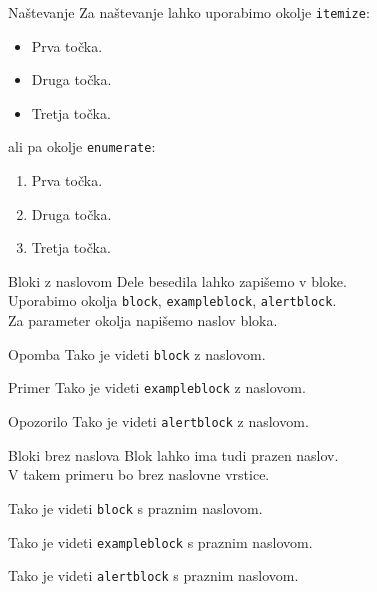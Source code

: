 \documentclass{beamer}
\begin{document}
   \begin{frame}{Naštevanje}
   Za naštevanje lahko uporabimo okolje \texttt{itemize}:
   \begin{itemize}   
      \item Prva točka.
      \item Druga točka.
      \item Tretja točka.
   \end{itemize}
   ali pa okolje \texttt{enumerate}:
   \begin{enumerate}
      \item Prva točka.
      \item Druga točka.
      \item Tretja točka.
\end{enumerate}
   \end{frame}
\begin{frame}{Bloki z naslovom}
   Dele besedila lahko zapišemo v bloke. \\
   Uporabimo okolja \texttt{block}, \texttt{exampleblock}, \texttt{alertblock}. \\
   Za parameter okolja napišemo naslov bloka.
   \begin{block}{Opomba}
      Tako je videti \texttt{block} z naslovom.
   \end{block}
   \begin{exampleblock}{Primer}
      Tako je videti \texttt{exampleblock} z naslovom.
   \end{exampleblock}
   \begin{alertblock}{Opozorilo}
      Tako je videti \texttt{alertblock} z naslovom.
   \end{alertblock}
\end{frame}
\begin{frame}{Bloki brez naslova}
   Blok lahko ima tudi prazen naslov. \\
   V takem primeru bo brez naslovne vrstice.
     \begin{block}{}
      Tako je videti \texttt{block} s praznim naslovom.
     \end{block}
      \begin{exampleblock}{}
         Tako je videti \texttt{exampleblock} s praznim naslovom.
      \end{exampleblock}
      \begin{alertblock}{}
      Tako je videti \texttt{alertblock} s praznim naslovom.
      \end{alertblock}
\end{frame}
\end{document}
